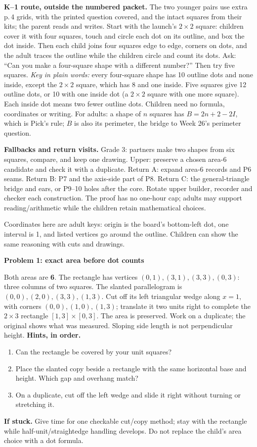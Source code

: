 \documentclass[letterpaper,11pt]{article}
\newcommand{\heading}[1]{\vspace{3pt}{\large\bfseries #1}\par}
\newcommand{\subhead}[1]{\vspace{2pt}\textbf{#1}\par}
\newcommand{\hints}[3]{\textbf{Hints, in order.}\begin{enumerate}\item #1\item #2\item #3\end{enumerate}}
\begin{document}
\textbf{K--1 route, outside the numbered packet.} The two younger pairs use extra p.\,4 grids, with the printed question covered, and the intact squares from their kits; the parent reads and writes. Start with the launch's $2\times2$ square: children cover it with four squares, touch and circle each dot on its outline, and box the dot inside. Then each child joins four squares edge to edge, corners on dots, and the adult traces the outline while the children circle and count its dots. Ask: ``Can you make a four-square shape with a different number?'' Then try five squares. \emph{Key in plain words:} every four-square shape has 10 outline dots and none inside, except the $2\times2$ square, which has 8 and one inside. Five squares give 12 outline dots, or 10 with one inside dot (a $2\times2$ square with one more square). Each inside dot means two fewer outline dots. Children need no formula, coordinates or writing. For adults: a shape of $n$ squares has $B=2n+2-2I$, which is Pick's rule; $B$ is also its perimeter, the bridge to Week 26's perimeter question.

\textbf{Fallbacks and return visits.} Grade 3: partners make two shapes from six squares, compare, and keep one drawing. Upper: preserve a chosen area-6 candidate and check it with a duplicate. Return A: expand area-6 records and P6 seams. Return B: P7 and the axis-side part of P8. Return C: the general-triangle bridge and ears, or P9--10 holes after the core. Rotate upper builder, recorder and checker each construction. The proof has no one-hour cap; adults may support reading/arithmetic while the children retain mathematical choices.
\newpage

\heading{Problems 1--3 / student pp.\,1--3 / concrete core}
Coordinates here are adult keys: origin is the board's bottom-left dot, one interval is 1, and listed vertices go around the outline. Children can show the same reasoning with cuts and drawings.

\subhead{Problem 1: exact area before dot counts}
Both areas are \textbf{6}. The rectangle has vertices $(0,1),\allowbreak(3,1),\allowbreak(3,3),\allowbreak(0,3)$: three columns of two squares. The slanted parallelogram is $(0,0),\allowbreak(2,0),\allowbreak(3,3),\allowbreak(1,3)$. Cut off its left triangular wedge along $x=1$, with corners $(0,0),\allowbreak(1,0),\allowbreak(1,3)$; translate it two units right to complete the $2\times3$ rectangle $[1,3]\times[0,3]$. The area is preserved. Work on a duplicate; the original shows what was measured. Sloping side length is not perpendicular height.
\hints{Can the rectangle be covered by your unit squares?}{Place the slanted copy beside a rectangle with the same horizontal base and height. Which gap and overhang match?}{On a duplicate, cut off the left wedge and slide it right without turning or stretching it.}
\textbf{If stuck.} Give time for one checkable cut/copy method; stay with the rectangle while half-unit/straightedge handling develops. Do not replace the child's area choice with a dot formula.
\end{document}
